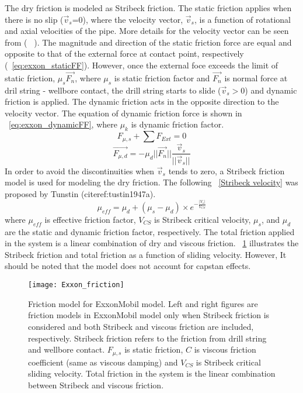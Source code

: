 The dry friction is modeled as Stribeck friction. \resolvedcomment{} The static friction applies when there is no slip ($\vec{v}_s$=0), where the velocity vector, $\vec{v}_s$, is a function of rotational and axial velocities of the pipe. More details for the velocity vector can be seen from (~ \cite{ref:cayeux2018a}). The magnitude and direction of the static friction force are equal and opposite to that of the external force at contact point, respectively (\equationname~\ref{eq:exxon_staticFF}). However, once the external foce exceeds the limit of static friction, $\mu_s \vec{F_n}$, where $\mu_s$ is static friction factor and $\vec{F_n}$ is normal force at dril string - wellbore contact, the drill string starts to slide ($\vec{v}_s > 0$) and dynamic friction is applied. The dynamic friction acts in the opposite direction to the velocity vector. The equation of dynamic friction force is shown in \equationname~\ref{eq:exxon_dynamicFF}, where $\mu_k$ is dynamic friction factor.
\begin{equation}\label{eq:exxon_staticFF}
  F_{\mu,s} + \sum F_{Ext} = 0
\end{equation}
\begin{equation}\label{eq:exxon_dynamicFF}
  \vec{F_{\mu, d}} = -\mu_d ||{\vec{F_n}}||\frac{\vec{v}_s}{{||\vec{v}_s}||}
\end{equation}
In order to avoid the discontinuities when $\vec{v}_s$ tends to zero, a Stribeck friction model is used for modeling the dry friction. The following \equationname~\ref{Stribeck velocity} was proposed by Tunstin (cite{ref:tustin1947a}).
\begin{equation}\label{Stribeck velocity}
\mu_{eff} = \mu_{d} + (\mu_{s} - \mu_{d})\times e^{-\frac{|V_s|}{V_{CS}}}
\end{equation}
where $\mu_{eff}$ is effective friction factor, $V_{CS}$ is Stribeck critical velocity, $\mu_{s}$, and $\mu_{d}$ are the static and dynamic friction factor, respectively. The total friction applied in the system is a linear combination of dry and viscous friction. \figurename~\ref{figure_Exxon_friction} illustrates the Stribeck friction and total friction as a function of sliding velocity. However, It should be noted that the model does not account for capstan effects.  
\begin{figure}
  \centering
  \texttt{[image: Exxon\_friction]}
  \caption[Friction model for ExxonMobil model]{Friction model for ExxonMobil model. Left and right figures are friction models in ExxonMobil model only when Stribeck friction is considered and both Stribeck and viscous friction are included, respectively. Stribeck friction refers to the friction from drill string and wellbore contact. $F_{\mu, s}$ is static friction, $C$ is viscous friction coefficient (same as viscous damping) and $V_{CS}$ is Stribeck critical sliding velocity. Total friction in the system is the linear combination between Stribeck and viscous friction.}\label{figure_Exxon_friction}
\end{figure}

